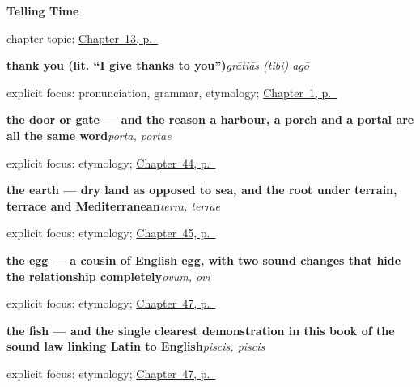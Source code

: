 \noindent\begin{minipage}[t]{\linewidth}
\raggedright
\textbf{Telling Time}\par
\footnotesize chapter topic; \hyperref[ch:la-telling-time]{Chapter~13, p.~\pageref*{ch:la-telling-time}}
\end{minipage}\par\smallskip

\noindent\begin{minipage}[t]{\linewidth}
\raggedright
\textbf{thank you (lit. \textquotedblleft{}I give thanks to you\textquotedblright{})}\enspace\emph{grātiās (tibi) agō}\par
\footnotesize explicit focus: pronunciation, grammar, etymology; \hyperref[ch:greetings]{Chapter~1, p.~\pageref*{ch:greetings}}
\end{minipage}\par\smallskip

\noindent\begin{minipage}[t]{\linewidth}
\raggedright
\textbf{the door or gate — and the reason a harbour, a porch and a portal are all the same word}\enspace\emph{porta, portae}\par
\footnotesize explicit focus: etymology; \hyperref[ch:la-domus]{Chapter~44, p.~\pageref*{ch:la-domus}}
\end{minipage}\par\smallskip

\noindent\begin{minipage}[t]{\linewidth}
\raggedright
\textbf{the earth — dry land as opposed to sea, and the root under terrain, terrace and Mediterranean}\enspace\emph{terra, terrae}\par
\footnotesize explicit focus: etymology; \hyperref[ch:la-mundus]{Chapter~45, p.~\pageref*{ch:la-mundus}}
\end{minipage}\par\smallskip

\noindent\begin{minipage}[t]{\linewidth}
\raggedright
\textbf{the egg — a cousin of English egg, with two sound changes that hide the relationship completely}\enspace\emph{ōvum, ōvī}\par
\footnotesize explicit focus: etymology; \hyperref[ch:la-mensa]{Chapter~47, p.~\pageref*{ch:la-mensa}}
\end{minipage}\par\smallskip

\noindent\begin{minipage}[t]{\linewidth}
\raggedright
\textbf{the fish — and the single clearest demonstration in this book of the sound law linking Latin to English}\enspace\emph{piscis, piscis}\par
\footnotesize explicit focus: etymology; \hyperref[ch:la-mensa]{Chapter~47, p.~\pageref*{ch:la-mensa}}
\end{minipage}\par\smallskip

